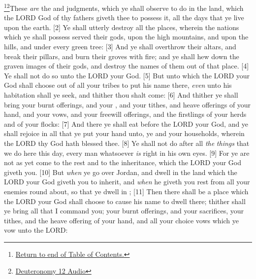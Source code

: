 \footnote{\textcolor[cmyk]{0.99998,1,0,0}{\hyperlink{TOC}{Return to end of Table of Contents.}}}\footnote{\href{https://audiobible.com/bible/deuteronomy_12.html}{\textcolor[cmyk]{0.99998,1,0,0}{Deuteronomy 12 Audio}}}\textcolor[cmyk]{0.99998,1,0,0}{These \emph{are} the  and judgments, which ye shall observe to do in the land, which the LORD God of thy fathers giveth thee to possess it, all the days that ye live upon the earth.}
[2] \textcolor[cmyk]{0.99998,1,0,0}{Ye shall utterly destroy all the places, wherein the nations which ye shall possess served their gods, upon the high mountains, and upon the hills, and under every green tree:}
[3] \textcolor[cmyk]{0.99998,1,0,0}{And ye shall overthrow their altars, and break their pillars, and burn their groves with fire; and ye shall hew down the graven images of their gods, and destroy the names of them out of that place.}
[4] \textcolor[cmyk]{0.99998,1,0,0}{Ye shall not do so unto the LORD your God.}
[5] \textcolor[cmyk]{0.99998,1,0,0}{But unto  which the LORD your God shall choose out of all your tribes to put his name there, \emph{even} unto his habitation shall ye seek, and thither thou shalt come:}
[6] \textcolor[cmyk]{0.99998,1,0,0}{And thither ye shall bring your burnt offerings, and your , and your tithes, and heave offerings of your hand, and your vows, and your freewill offerings, and the firstlings of your herds and of your flocks:}
[7] \textcolor[cmyk]{0.99998,1,0,0}{And there ye shall eat before the LORD your God, and ye shall rejoice in all that ye put your hand unto, ye and your households, wherein the LORD thy God hath blessed thee.}
[8] \textcolor[cmyk]{0.99998,1,0,0}{Ye shall not do after all \emph{the} \emph{things} that we do here this day, every man whatsoever \emph{is} right in his own eyes.}
[9] \textcolor[cmyk]{0.99998,1,0,0}{For ye are not as yet come to the rest and to the inheritance, which the LORD your God giveth you.}
[10] \textcolor[cmyk]{0.99998,1,0,0}{But \emph{when} ye go over Jordan, and dwell in the land which the LORD your God giveth you to inherit, and \emph{when} he giveth you rest from all your enemies round about, so that ye dwell in ;}
[11] \textcolor[cmyk]{0.99998,1,0,0}{Then there shall be a place which the LORD your God shall choose to cause his name to dwell there; thither shall ye bring all that I command you; your burnt offerings, and your sacrifices, your tithes, and the heave offering of your hand, and all your choice vows which ye vow unto the LORD:}
